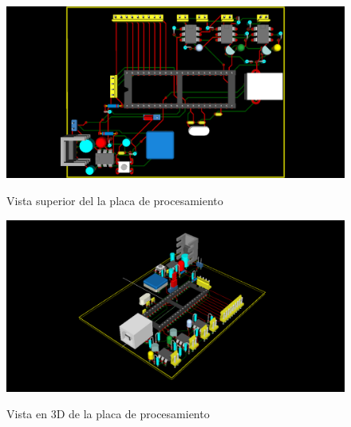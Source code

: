 \begin{figure}[htp]
  \centering
  \includegraphics[width=14cm]{./img/pic_board_3d_1.png}
  \label{fig:pic_board_3d_1}
  \caption{Vista superior del la placa de procesamiento}
\end{figure}

\begin{figure}[hb]
  \centering
  \includegraphics[width=14cm]{./img/pic_board_3d_2.png}
  \label{fig:pic_board_3d_2}
  \caption{Vista en 3D de la placa de procesamiento}
\end{figure}